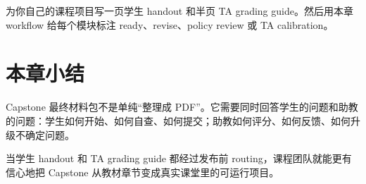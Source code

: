 \begin{exercisebox}[开放练习]
为你自己的课程项目写一页学生 handout 和半页 TA grading guide。然后用本章 workflow 给每个模块标注 ready、revise、policy review 或 TA calibration。
\end{exercisebox}

\section{本章小结}

Capstone 最终材料包不是单纯“整理成 PDF”。它需要同时回答学生的问题和助教的问题：学生如何开始、如何自查、如何提交；助教如何评分、如何反馈、如何升级不确定问题。

当学生 handout 和 TA grading guide 都经过发布前 routing，课程团队就能更有信心地把 Capstone 从教材章节变成真实课堂里的可运行项目。
